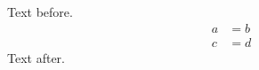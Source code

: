 \documentclass{article}
\begin{document}
Text before.
\begin{align}
a &= b \\
c &= d
\end{align}
Text after.
\end{document}
